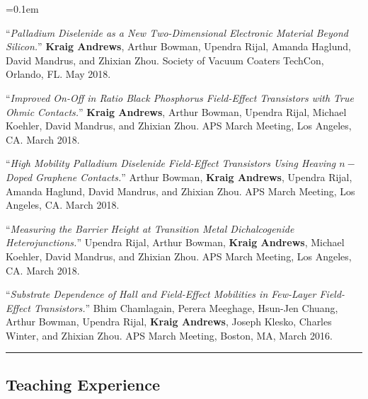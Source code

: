 \documentclass[10pt,letterpaper]{article}
\begin{document}
\begin{enumerate*}
	\parskip=0.1em
	\item ``\emph{Palladium Diselenide as a New Two-Dimensional Electronic Material Beyond Silicon.}''  
	\textbf{Kraig Andrews}, Arthur Bowman, Upendra Rijal, Amanda Haglund, David Mandrus, and Zhixian Zhou.
	Society of Vacuum Coaters TechCon, Orlando, FL. May 2018.
	\item ``\emph{Improved On-Off in Ratio Black Phosphorus Field-Effect Transistors with True Ohmic Contacts.}''  
	\textbf{Kraig Andrews}, Arthur Bowman, Upendra Rijal, Michael Koehler, David Mandrus, and Zhixian Zhou. 
	APS March Meeting, Los Angeles, CA. March 2018.
	\item ``\emph{High Mobility Palladium Diselenide Field-Effect Transistors Using Heaving $n-$Doped Graphene Contacts.}''
	Arthur Bowman, \textbf{Kraig Andrews}, Upendra Rijal, Amanda Haglund, David Mandrus, and Zhixian Zhou.
	APS March Meeting, Los Angeles, CA. March 2018.
	\item ``\emph{Measuring the Barrier Height at Transition Metal Dichalcogenide Heterojunctions.}''
	Upendra Rijal, Arthur Bowman, \textbf{Kraig Andrews}, Michael Koehler, David Mandrus, and Zhixian Zhou.
	APS March Meeting, Los Angeles, CA. March 2018.
	\item ``\emph{Substrate Dependence of Hall and Field-Effect Mobilities in Few-Layer  Field-Effect Transistors.}''
	Bhim Chamlagain, Perera Meeghage, Hsun-Jen Chuang, Arthur Bowman, Upendra Rijal, \textbf{Kraig Andrews}, Joseph Klesko,
	Charles Winter, and Zhixian Zhou. APS March Meeting, Boston, MA, March 2016.
\end{enumerate*}

\hrule
\vspace{-0.4em}
\subsection*{Teaching Experience}
\end{document}
